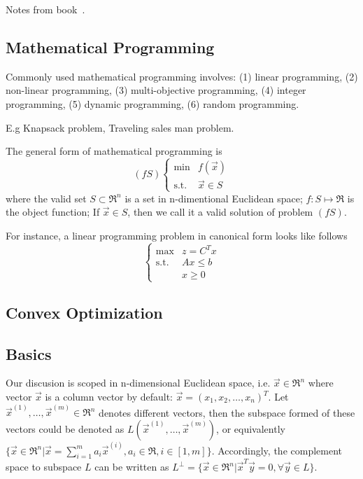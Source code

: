 
Notes from book~\cite{bib:orop}.

\subsection{Mathematical Programming}

Commonly used mathematical programming involves: (1) linear programming,
(2) non-linear programming, (3) multi-objective programming,
(4) integer programming, (5) dynamic programming, (6) random programming.

E.g Knapsack problem, Traveling sales man problem.

The general form of mathematical programming is
$$ (fS) \left\{ \begin{array}{lc}
  \text{min} & f(\vec{x}) \\
  \text{s.t.} & \vec{x} \in S
  \end{array} \right. $$
where the valid set $S \subset \Re^n$ is a set in n-dimentional
Euclidean space; $f: S\mapsto \Re$ is the object function;
If $\vec{x} \in S$, then we call it a valid solution of problem $(fS)$.

For instance, a linear programming problem in canonical form looks like follows
$$ \left\{ \begin{array}{ll}
  \text{max} & z = C^T x \\
  \text{s.t.} & Ax \leqslant b \\
              & x \geqslant 0 \end{array} \right. $$

\subsection{Convex Optimization}



 \subsection{Basics}

Our discusion is scoped in n-dimensional Euclidean space, i.e. $\vec{x}\in\Re^n$ where
vector $\vec{x}$ is a column vector by default: $\vec{x} = (x_1, x_2, \ldots, x_n)^T$.
Let $\vec{x}^{(1)}, \ldots, \vec{x}^{(m)}\in \Re^n$ denotes different vectors, then
the subspace formed of these vectors could be denoted as $L(\vec{x}^{(1)}, \ldots, \vec{x}^{(m)})$,
or equivalently $\{\vec{x}\in\Re^n | \vec{x}=\sum\limits_{i=1}^m a_i \vec{x}^{(i)}, a_i \in \Re, i \in [1,m]\}$.
Accordingly, the complement space to subspace $L$ can be written as
$L^{\perp} = \{ \vec{x} \in \Re^n | \vec{x}^T\vec{y}=0, \forall \vec{y}\in L \}$.

